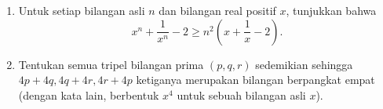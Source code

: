 \documentclass[a4paper,12pt]{article}
\begin{document}
\begin{enumerate}
\item Untuk setiap bilangan asli $n$ dan bilangan real positif $x$, tunjukkan bahwa $$x^n+\dfrac{1}{x^n}-2 \ge n^2 \left(x+\frac{1}{x}-2\right).$$

\item Tentukan semua tripel bilangan prima $(p,q,r)$ sedemikian sehingga $4p+4q,4q+4r,4r+4p$ ketiganya merupakan bilangan berpangkat empat (dengan kata lain, berbentuk $x^4$ untuk sebuah bilangan asli $x$).
\end{enumerate}
\end{document}
